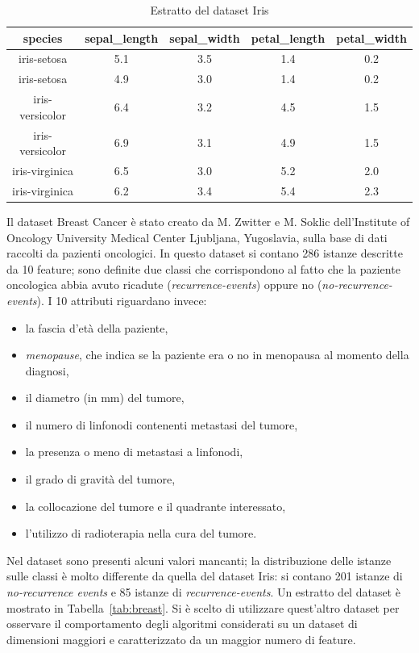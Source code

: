 \documentclass[oneside, openany]{book}
\begin{document}
	\begin{table}[h]
		\caption{Estratto del dataset Iris}
		\begin{center}
			\begin{tabular}{|c|c|c|c|c|}
					\hline
					species &  sepal\_length &  sepal\_width &  petal\_length &  petal\_width \\
					\hline
					iris-setosa &           5.1 &          3.5 &           1.4 &          0.2 \\
					iris-setosa &           4.9 &          3.0 &           1.4 &          0.2 \\
					iris-versicolor &           6.4 &		3.2 &			4.5 &			1.5 \\
					iris-versicolor &           6.9 &          3.1 &        4.9 &          1.5 \\
					iris-virginica &           6.5 &          3.0 &           5.2 &          2.0 \\
					iris-virginica &           6.2 &          3.4 &           5.4 &          2.3 \\
					\hline
			\end{tabular}
		\end{center}
		\label{tab:iris}
	\end{table}

	Il dataset Breast Cancer è stato creato da M. Zwitter e M. Soklic dell'Institute of Oncology University Medical Center Ljubljana, Yugoslavia, sulla base di dati raccolti da pazienti oncologici. In questo dataset si contano 286 istanze descritte da 10 feature; sono definite due classi che corrispondono al fatto che la paziente oncologica abbia avuto ricadute (\textit{recurrence-events}) oppure no (\textit{no-recurrence-events}). I 10 attributi riguardano invece:
	\begin{itemize}
		\item{la fascia d'età della paziente,}
		\item{\textit{menopause}, che indica se la paziente era o no in menopausa al momento della diagnosi,}
		\item{il diametro (in mm) del tumore,}
		\item{il numero di linfonodi contenenti metastasi del tumore,}
		\item{la presenza o meno di metastasi a linfonodi,}
		\item{il grado di gravità del tumore,}
		\item{la collocazione del tumore e il quadrante interessato,}
		\item{l'utilizzo di radioterapia nella cura del tumore.}
	\end{itemize}	
	Nel dataset sono presenti alcuni valori mancanti; la distribuzione delle istanze sulle classi è molto differente da quella del dataset Iris: si contano 201 istanze di \textit{no-recurrence events} e 85 istanze di \textit{recurrence-events}. Un estratto del dataset è mostrato in Tabella~\ref{tab:breast}. Si è scelto di utilizzare quest'altro dataset per osservare il comportamento degli algoritmi considerati su un dataset di dimensioni maggiori e caratterizzato da un maggior numero di feature.
	
\end{document}
